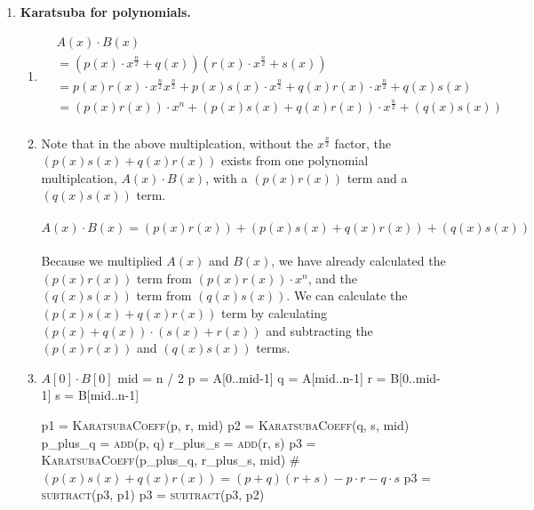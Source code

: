 \documentclass{article}
\begin{document}
\begin{enumerate}
    \pagebreak
    \item \textbf{Karatsuba for polynomials.}
    \begin{enumerate}
        \item 
        \begin{align*}
            & A(x)\cdot B(x) \\
            &= (p(x)\cdot x^\frac{n}{2} + q(x))(r(x)\cdot x^\frac{n}{2} + s(x)) \\
            &= p(x)r(x)\cdot x^\frac{n}{2}x^\frac{n}{2} + p(x)s(x)\cdot x^\frac{n}{2} + q(x)r(x)\cdot x^\frac{n}{2} + q(x)s(x) \\
            &= (p(x)r(x))\cdot x^n + (p(x)s(x) + q(x)r(x))\cdot x^\frac{n}{2} + (q(x)s(x)) \\
        \end{align*}
        \item Note that in the above multiplcation, without the $x^\frac{n}{2}$ factor, the $(p(x)s(x) + q(x)r(x))$ exists from one polynomial multiplcation, $A(x)\cdot B(x)$, with a $(p(x)r(x))$ term and a $(q(x)s(x))$ term.
        \\\\
        $A(x)\cdot B(x) = (p(x)r(x)) + (p(x)s(x) + q(x)r(x)) + (q(x)s(x))$
        \\\\
        Because we multiplied $A(x)$ and $B(x)$, we have already calculated the $(p(x)r(x))$ term from $(p(x)r(x))\cdot x^n$, and the $(q(x)s(x))$ term from $(q(x)s(x))$. We can calculate the $(p(x)s(x) + q(x)r(x))$ term by calculating $(p(x) + q(x))\cdot(s(x) + r(x))$ and subtracting the $(p(x)r(x))$ and $(q(x)s(x))$ terms.
        \item 
        \begin{algorithm}
            \begin{algorithmic}[1]
                        \State \Return $A[0] \cdot B[0]$
                    \EndIf
                    \State mid = n / 2
                    \State p = A[0..mid-1]
                    \State q = A[mid..n-1]
                    \State r = B[0..mid-1]
                    \State s = B[mid..n-1]

                    \State p1 = \textsc{KaratsubaCoeff}(p, r, mid)
                    \State p2 = \textsc{KaratsubaCoeff}(q, s, mid)
                    \State p\_plus\_q = \textsc{add}(p, q)
                    \State r\_plus\_s = \textsc{add}(r, s)
                    \State p3 = \textsc{KaratsubaCoeff}(p\_plus\_q, r\_plus\_s, mid)
                    \State \# $(p(x)s(x) + q(x)r(x)) = (p+q)(r+s) - p·r - q·s$
                    \State p3 = \textsc{subtract}(p3, p1)
                    \State p3 = \textsc{subtract}(p3, p2)
                    \State {}
                \EndFunction
            \end{algorithmic}
        \end{algorithm}


\end{enumerate}
\end{enumerate}
\end{document}
